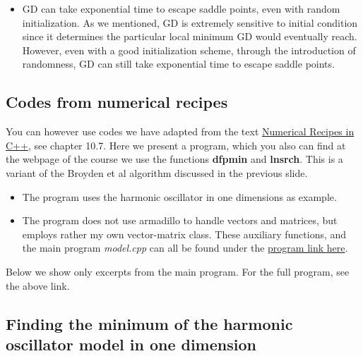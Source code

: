 \documentclass[%
oneside,                 %
final,                   %
10pt]{article}
\begin{document}
\begin{itemize}
\item GD can take exponential time to escape saddle points, even with random initialization. As we mentioned, GD is extremely sensitive to initial condition since it determines the particular local minimum GD would eventually reach. However, even with a good initialization scheme, through the introduction of randomness, GD can still take exponential time to escape saddle points.
\end{itemize}

\noindent
\subsection*{Codes from numerical recipes}

You can however use codes we have adapted from the text \href{{http://www.nr.com/}}{Numerical Recipes in C++}, see chapter 10.7.  
Here we present a program, which you also can find at the webpage of the course we use the functions \textbf{dfpmin} and \textbf{lnsrch}.  This is a variant of the Broyden et al algorithm discussed in the previous slide.

\begin{itemize}
\item The program uses the harmonic oscillator in one dimensions as example.

\item The program does not use armadillo to handle vectors and matrices, but employs rather my own vector-matrix class. These auxiliary functions, and the main program \emph{model.cpp} can all be found under the \href{{https://github.com/CompPhysics/ComputationalPhysics2/tree/gh-pages/doc/pub/cg/programs/c%
\end{itemize}

\noindent
Below we show only excerpts from the main program. For the full program, see the above link.

\subsection*{Finding the minimum of the harmonic oscillator model in one dimension}
\end{document}
